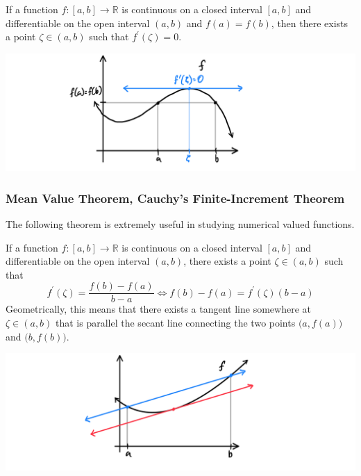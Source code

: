    \begin{theorem}
    If a function $f: [a, b] \longrightarrow \mathbb{R}$ is continuous on a closed interval $[a,b]$ and differentiable on the open interval $(a, b)$ and $f(a) = f(b)$, then there exists a point $\zeta \in (a, b)$ such that $f^\prime (\zeta) = 0$. 
    \begin{center}
        \includegraphics[scale=0.25]{img/Analysis_Rolles_Theorem.PNG}
    \end{center}
    \end{theorem}

    \subsubsection{Mean Value Theorem, Cauchy's Finite-Increment Theorem}

    The following theorem is extremely useful in studying numerical valued functions. 

    \begin{theorem}
    If a function $f: [a,b] \longrightarrow \mathbb{R}$ is continuous on a closed interval $[a,b]$ and differentiable on the open interval $(a, b)$, there exists a point $\zeta \in (a, b)$ such that 
    \[f^\prime (\zeta) = \frac{f(b) - f(a)}{b - a} \iff f(b) - f(a) = f^\prime (\zeta) (b-a)\]
    Geometrically, this means that there exists a tangent line somewhere at $\zeta \in (a, b)$ that is parallel the secant line connecting the two points $\big(a, f(a)\big)$ and $\big( b, f(b)\big)$. 
    \begin{center}
        \includegraphics[scale=0.25]{img/Analysis_Mean_Value_Theorem_Diagram.PNG}
    \end{center}
    \end{theorem}

